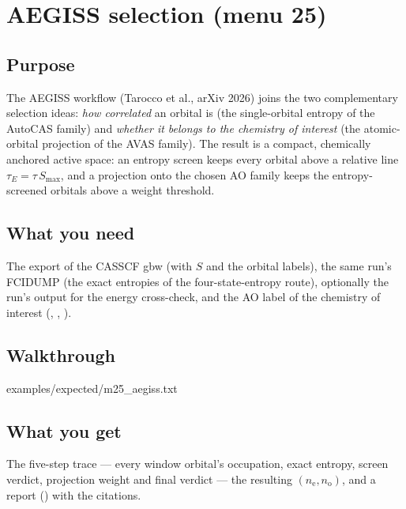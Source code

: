 \chapter{AEGISS selection (menu 25)}
\label{ch:menu25}

\section{Purpose}

The AEGISS workflow (Tarocco et al., arXiv 2026) joins the two complementary
selection ideas: \emph{how correlated} an orbital is (the single-orbital
entropy of the AutoCAS family) and \emph{whether it belongs to the chemistry
of interest} (the atomic-orbital projection of the AVAS family).  The result
is a compact, chemically anchored active space: an entropy screen keeps every
orbital above a relative line $\tau_E = \tau\, S_{\max}$, and a projection
onto the chosen AO family keeps the entropy-screened orbitals above a weight
threshold.

\section{What you need}

The  export of the CASSCF gbw (with $S$ and the orbital
labels), the same run's FCIDUMP (the exact entropies of the four-state-entropy
route), optionally the run's output for the energy cross-check, and the AO
label of the chemistry of interest (, , ).

\section{Walkthrough}


  {examples/expected/m25_aegiss.txt}

\section{What you get}

The five-step trace --- every window orbital's occupation, exact entropy,
screen verdict, projection weight and final verdict --- the resulting
$(n_{\mathrm{e}}, n_{\mathrm{o}})$, and a report
() with the citations.

